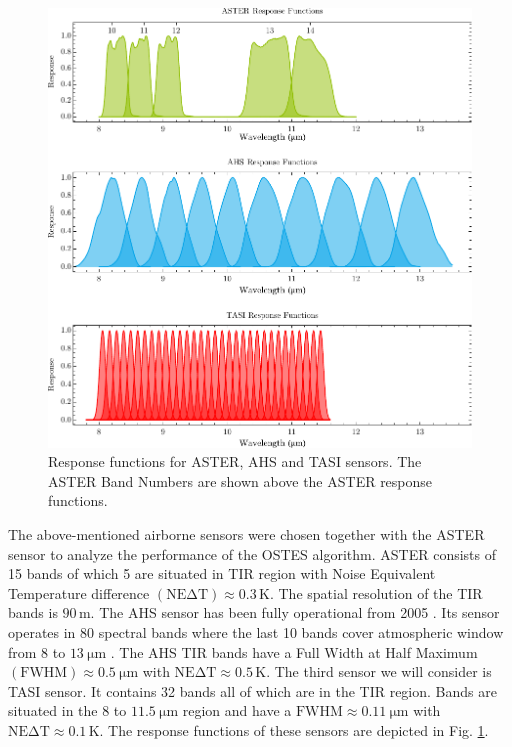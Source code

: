 \begin{figure}[!t]
\centering
\includegraphics[width=0.9\linewidth]{pics/Chapter_04/response_functions_all.pdf}
\vspace{1.5 em}
\caption{Response functions for ASTER, AHS and TASI sensors. The ASTER Band Numbers are shown above the ASTER response functions.}
\label{fig:ResponseFunctions}
\end{figure}
 
The above-mentioned airborne sensors were chosen together with the ASTER sensor to analyze the performance of the OSTES algorithm.
ASTER consists of 15 bands of which 5 are situated in TIR region with Noise Equivalent Temperature difference $\mathrm{(NE\Delta T)} \approx 0.3\,\mathrm{K}$. The spatial resolution of the TIR bands is $90\,\mathrm{m}$.
The AHS sensor has been fully operational from 2005 \cite{FM05}. Its sensor operates in 80 spectral bands where the last 10 bands cover atmospheric window from 8 to $\SI{13}{\micro\meter}$ \cite{SJ06}. The AHS TIR bands have a  {Full Width at Half Maximum} $\mathrm{(FWHM)} \approx \SI{0.5}{\micro\meter}$ with $\mathrm{NE\Delta T} \approx 0.5\,\mathrm{K}$.
The third sensor we will consider is TASI sensor. It contains 32 bands all of which are in the TIR region. Bands are situated in the 8 to $\SI{11.5}{\micro\meter}$ region and have a $\mathrm{FWHM} \approx \SI{0.11}{\micro\meter}$ with $\mathrm{NE\Delta T} \approx 0.1\,\mathrm{K}$. The response functions of these sensors are depicted in Fig. \ref{fig:ResponseFunctions}.

